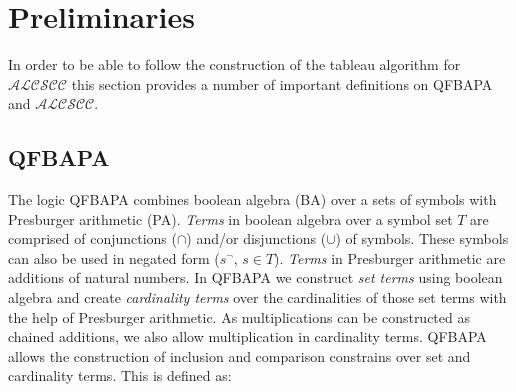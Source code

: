 \documentclass{book}
\theoremstyle{break}
\theoremstyle{definition}
\begin{document}
\chapter{Preliminaries}
In order to be able to follow the construction of the tableau algorithm for $\mathcal{ALCSCC}$ this section provides a number of important definitions on QFBAPA and $\mathcal{ALCSCC}$. 
\section{QFBAPA}
The logic QFBAPA \cite{KuncakRinard} combines boolean algebra (BA) over a sets of symbols with Presburger arithmetic (PA). \textit{Terms} in boolean algebra over a symbol set $T$ are comprised of conjunctions ($\cap$) and/or disjunctions ($\cup$) of symbols. These symbols can also be used in negated form ($s^\neg$, $s\in T$). \textit{Terms} in Presburger arithmetic are additions of natural numbers. In QFBAPA we construct \textit{set terms} using boolean algebra and create \textit{cardinality terms} over the cardinalities of those set terms with the help of Presburger arithmetic. As multiplications can be constructed as chained additions, we also allow multiplication in cardinality terms. QFBAPA allows the construction of inclusion and comparison constrains over set and cardinality terms. This is defined as:
\end{document}
